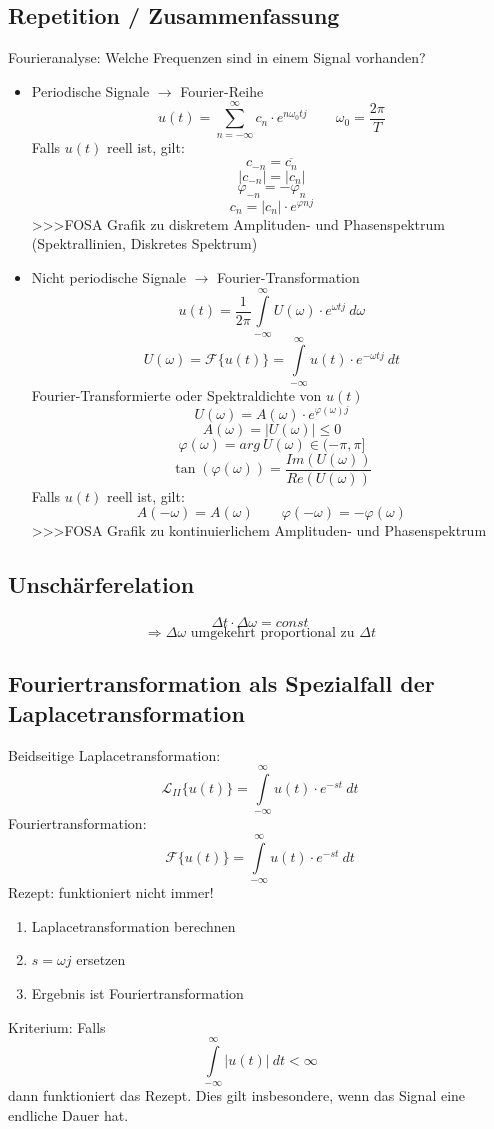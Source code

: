 \subsection{Repetition / Zusammenfassung}
Fourieranalyse: Welche Frequenzen sind in einem Signal vorhanden? 
\begin{itemize}
  \item Periodische Signale $\to$ Fourier-Reihe
        \[ u(t) = \sum\limits_{n = -\infty}^{\infty} c_n \cdot e^{n \omega_0 t j} 
        \qquad \omega_0 = \frac{2 \pi}{T} \]
        Falls $u(t)$ reell ist, gilt: 
        \[ c_{-n} = \overline{c_n} \]
        \[ |c_{-n}| = |c_n| \]
        \[ \varphi_{-n} = - \varphi_n \]
        \[ c_n = |c_n| \cdot e^{\varphi n j} \]
        >>>FOSA Grafik zu diskretem Amplituden- und Phasenspektrum
                (Spektrallinien, Diskretes Spektrum)
  \item Nicht periodische Signale $\to$ Fourier-Transformation
        \[ u(t) = \frac{1}{2 \pi} \int\limits_{-\infty}^{\infty} U(\omega) 
        \cdot e^{\omega t j} ~ d\omega \]
        \[ U(\omega) = \mathcal{F}\{ u(t) \} =  \int\limits_{-\infty}^{\infty} 
        u(t) \cdot e^{-\omega t j} ~ dt \]
        Fourier-Transformierte oder Spektraldichte von $u(t)$
        \[ U(\omega) = A(\omega) \cdot e^{\varphi(\omega) j} \]
        \[ A(\omega) = |U(\omega)| \leq 0 \]
        \[ \varphi(\omega) = arg ~ U(\omega) \in (-\pi , \pi \rbrack \]
        \[ \tan(\varphi(\omega)) = \frac{Im(U(\omega))}{Re(U(\omega))} \]
        Falls $u(t)$ reell ist, gilt: 
        \[ A(-\omega) = A(\omega) \qquad \varphi(-\omega) = -\varphi(\omega) \]
        >>>FOSA Grafik zu kontinuierlichem Amplituden- und Phasenspektrum
\end{itemize}

\subsection{Unschärferelation}
\[ \Delta t \cdot \Delta \omega = const \]
\[ \Rightarrow \Delta \omega \text{ umgekehrt proportional zu } \Delta t \]

\subsection{Fouriertransformation als Spezialfall der Laplacetransformation}
Beidseitige Laplacetransformation: 
\[ \mathcal{L}_{II} \{ u(t) \} = \int\limits_{-\infty}^{\infty} u(t) \cdot e^{-s t} ~ dt \]
Fouriertransformation: 
\[ \mathcal{F}      \{ u(t) \} = \int\limits_{-\infty}^{\infty} u(t) \cdot e^{-s t} ~ dt \]
Rezept: funktioniert nicht immer! 
\begin{enumerate}
  \item Laplacetransformation berechnen
  \item $s = \omega j$ ersetzen
  \item Ergebnis ist Fouriertransformation
\end{enumerate}
Kriterium: Falls 
\[ \int\limits_{-\infty}^{\infty} |u(t)| ~ dt < \infty \]
dann funktioniert das Rezept. 
Dies gilt insbesondere, wenn das Signal eine endliche Dauer hat. 


